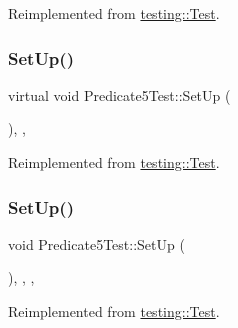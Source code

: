 Reimplemented from \mbox{\hyperlink{classtesting_1_1_test_a190315150c303ddf801313fd1a777733}{testing\+::\+Test}}.

\mbox{\label{class_predicate5_test_a42bf622b4f2134d0497cd42fd2e3e1df}} 
\subsubsection{\texorpdfstring{SetUp()}{SetUp()}\hspace{0.1cm}{\footnotesize\ttfamily [2/3]}}
{\footnotesize\ttfamily virtual void Predicate5\+Test\+::\+Set\+Up (\begin{DoxyParamCaption}{ }\end{DoxyParamCaption})\hspace{0.3cm}{\ttfamily [inline]}, {\ttfamily [protected]}, {\ttfamily [virtual]}}



Reimplemented from \mbox{\hyperlink{classtesting_1_1_test_a190315150c303ddf801313fd1a777733}{testing\+::\+Test}}.

\mbox{\label{class_predicate5_test_a699fbdc25f5eeb2e810887a60a4b3c1b}} 
\subsubsection{\texorpdfstring{SetUp()}{SetUp()}\hspace{0.1cm}{\footnotesize\ttfamily [3/3]}}
{\footnotesize\ttfamily void Predicate5\+Test\+::\+Set\+Up (\begin{DoxyParamCaption}{ }\end{DoxyParamCaption})\hspace{0.3cm}{\ttfamily [inline]}, {\ttfamily [override]}, {\ttfamily [protected]}, {\ttfamily [virtual]}}



Reimplemented from \mbox{\hyperlink{classtesting_1_1_test_a190315150c303ddf801313fd1a777733}{testing\+::\+Test}}.

\mbox{\label{class_predicate5_test_aab641802c35a2a90f8db0b04dc0c6064}} 
